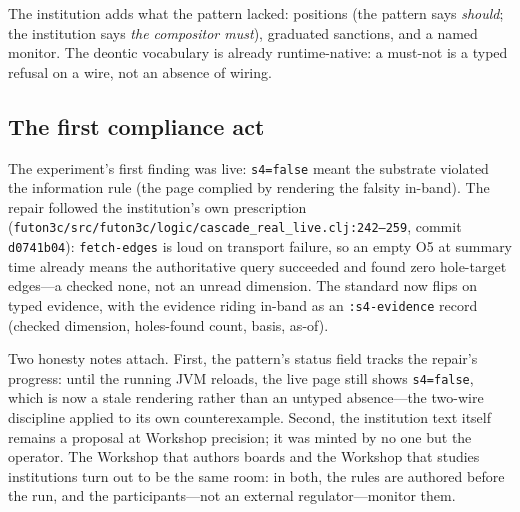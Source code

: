 The institution adds what the pattern lacked: positions (the pattern
says \emph{should}; the institution says \emph{the compositor must}),
graduated sanctions, and a named monitor. The deontic vocabulary is
already runtime-native: a must-not is a typed refusal on a wire, not an
absence of wiring.

\subsection{The first compliance act}

The experiment's first finding was live: \texttt{s4=false} meant the
substrate violated the information rule (the page complied by rendering
the falsity in-band). The repair followed the institution's own
prescription
(\texttt{futon3c/src/futon3c/logic/cascade\_real\_live.clj:242--259},
commit \texttt{d0741b04}): \texttt{fetch-edges} is loud on transport
failure, so an empty O5 at summary time already means the authoritative
query succeeded and found zero hole-target edges---a checked none, not
an unread dimension. The standard now flips on typed evidence, with the
evidence riding in-band as an \texttt{:s4-evidence} record (checked
dimension, holes-found count, basis, as-of).

Two honesty notes attach. First, the pattern's status field tracks the
repair's progress: until the running JVM reloads, the live page still
shows \texttt{s4=false}, which is now a stale rendering rather than an
untyped absence---the two-wire discipline applied to its own
counterexample. Second, the institution text itself remains a proposal
at Workshop precision; it was minted by no one but the operator. The
Workshop that authors boards and the Workshop that studies institutions
turn out to be the same room: in both, the rules are authored before
the run, and the participants---not an external regulator---monitor
them.
